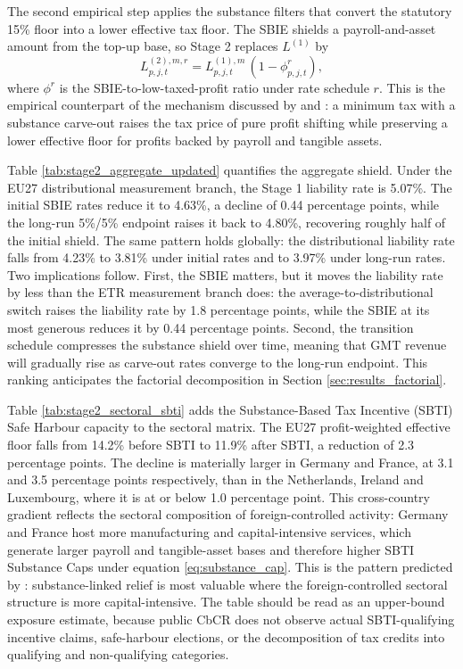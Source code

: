 \documentclass[11pt,a4paper]{article}
\begin{document}
The second empirical step applies the substance filters that convert the statutory 15\% floor into a lower effective tax floor. The SBIE shields a payroll-and-asset amount from the top-up base, so Stage 2 replaces $L^{(1)}$ by
\begin{equation}\label{eq:results_stage2_liability}
L_{p,j,t}^{(2),m,r}
= L_{p,j,t}^{(1),m}\,(1-\phi_{p,j,t}^{r}),
\end{equation}
where $\phi^{r}$ is the SBIE-to-low-taxed-profit ratio under rate schedule $r$. This is the empirical counterpart of the mechanism discussed by \citet{devereux2023} and \citet{schjelderup2024}: a minimum tax with a substance carve-out raises the tax price of pure profit shifting while preserving a lower effective floor for profits backed by payroll and tangible assets.



Table \ref{tab:stage2_aggregate_updated} quantifies the aggregate shield. Under the EU27 distributional measurement branch, the Stage 1 liability rate is 5.07\%. The initial SBIE rates reduce it to 4.63\%, a decline of 0.44 percentage points, while the long-run 5\%/5\% endpoint raises it back to 4.80\%, recovering roughly half of the initial shield. The same pattern holds globally: the distributional liability rate falls from 4.23\% to 3.81\% under initial rates and to 3.97\% under long-run rates. Two implications follow. First, the SBIE matters, but it moves the liability rate by less than the ETR measurement branch does: the average-to-distributional switch raises the liability rate by 1.8 percentage points, while the SBIE at its most generous reduces it by 0.44 percentage points. Second, the transition schedule compresses the substance shield over time, meaning that GMT revenue will gradually rise as carve-out rates converge to the long-run endpoint. This ranking anticipates the factorial decomposition in Section \ref{sec:results_factorial}.



Table \ref{tab:stage2_sectoral_sbti} adds the Substance-Based Tax Incentive (SBTI) Safe Harbour capacity to the sectoral matrix. The EU27 profit-weighted effective floor falls from 14.2\% before SBTI to 11.9\% after SBTI, a reduction of 2.3 percentage points. The decline is materially larger in Germany and France, at 3.1 and 3.5 percentage points respectively, than in the Netherlands, Ireland and Luxembourg, where it is at or below 1.0 percentage point. This cross-country gradient reflects the sectoral composition of foreign-controlled activity: Germany and France host more manufacturing and capital-intensive services, which generate larger payroll and tangible-asset bases and therefore higher SBTI Substance Caps under equation \eqref{eq:substance_cap}. This is the pattern predicted by \citet{schjelderup2024}: substance-linked relief is most valuable where the foreign-controlled sectoral structure is more capital-intensive. The table should be read as an upper-bound exposure estimate, because public CbCR does not observe actual SBTI-qualifying incentive claims, safe-harbour elections, or the decomposition of tax credits into qualifying and non-qualifying categories.
\end{document}
